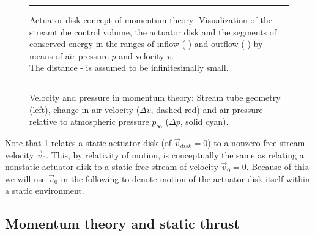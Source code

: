 \begin{figure}
	

			\rule{35em}{0.5pt}
	\caption[Actuator disk concept of momentum theory]
			{Actuator disk concept of momentum theory: Visualization of the streamtube control volume,
			the actuator disk and the segments of conserved energy in the ranges of inflow (-) and outflow (-) by means of air pressure $p$ and velocity $v$. \\ The distance - is
			assumed to be infinitesimally small.}
	\label{fig:streamtube_concept}
\end{figure}

\begin{figure}
	

	\rule{35em}{0.5pt}
	\caption[Velocity and pressure in momentum theory]
			{Velocity and pressure in momentum theory: Stream tube geometry (left),
			 change in air velocity ($\Delta v$, dashed red) and
			 air pressure relative to 
			 atmospheric pressure $p_\infty$ ($\Delta p$, solid cyan).}
	\label{fig:actuator_disc}
\end{figure}

Note that \cref{fig:streamtube_concept} relates a static actuator disk (of $\vec{v}_{disk} = 0$) to a nonzero free stream velocity $\vec{v}_0$. 
This, by relativity of motion, is conceptually the same as relating a nonstatic actuator disk to a static free stream of velocity $\vec{v}_0 = 0$. 
Because of this, we will use $\vec{v}_0$ in the following to denote motion of the actuator disk itself within a static environment.



\subsection{Momentum theory and static thrust}
\label{subsec:momentum_theory}

